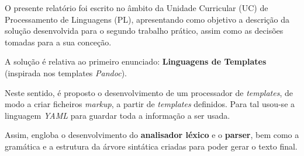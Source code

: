 \documentclass[../relatorio.tex]{subfiles}
\begin{document}
O presente relatório foi escrito no âmbito da Unidade Curricular (UC) de Processamento de Linguagens (PL), apresentando 
como objetivo a descrição da solução desenvolvida para o segundo trabalho prático, assim como as decisões 
tomadas para a sua conceção.

A solução é relativa ao primeiro enunciado: \textbf{Linguagens de Templates} (inspirada nos templates \textit{Pandoc}).

Neste sentido, é proposto o desenvolvimento de um processador de \textit{templates},
de modo a criar ficheiros \textit{markup}, a partir de \textit{templates} definidos. 
Para tal usou-se a linguagem \textit{YAML} para guardar toda a 
informação a ser usada.

Assim, engloba o desenvolvimento do \textbf{analisador léxico} e o \textbf{parser}, 
bem como a gramática e a estrutura da árvore sintática criadas  
para poder gerar o texto final. 
\end{document}
